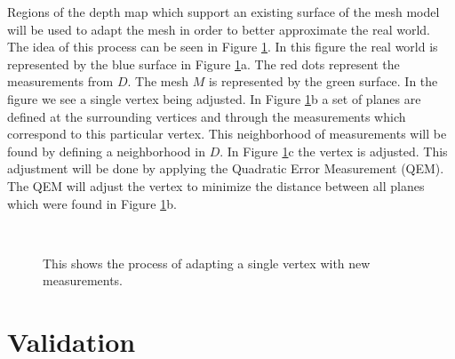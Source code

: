 \documentclass[12pt]{article}
\begin{document}
Regions of the depth map which support an existing surface of the mesh
model will be used to adapt the mesh in order to better approximate the
real world. The idea of this process can be seen in Figure
\ref{fig:AM}. In this figure the real world is represented by the blue
surface in Figure \ref{fig:AM}a. The red dots represent the measurements
from $D$. The mesh $M$ is represented by the green surface. In the
figure we see a single vertex being adjusted. In Figure \ref{fig:AM}b a
set of planes are defined at the surrounding vertices and through the
measurements which correspond to this particular vertex. This
neighborhood of measurements will be found by defining a neighborhood in
$D$. In Figure \ref{fig:AM}c the vertex is adjusted. This adjustment
will be done by applying the Quadratic Error Measurement (QEM). The QEM
will adjust the vertex to minimize the distance between all planes which
were found in Figure \ref{fig:AM}b.    

\begin{figure}[h]
\centering
{} \quad
{} \quad
{} \\
\caption{This shows the process of adapting a single vertex with new
measurements. }
\label{fig:AM}
\end{figure}

\section{Validation}
\label{ch:validation}
\end{document}
